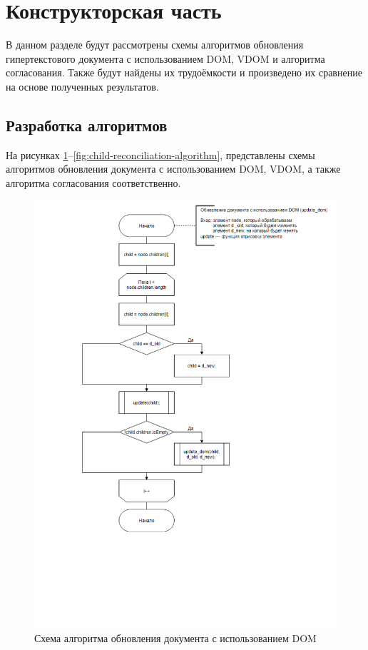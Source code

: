 \section{Конструкторская часть}

В данном разделе будут рассмотрены схемы алгоритмов обновления гипертекстового документа с использованием DOM, VDOM и алгоритма согласования. 
Также будут найдены их трудоёмкости и произведено их сравнение на основе полученных результатов.

\subsection{Разработка алгоритмов}

На рисунках \ref{fig:dom-algorithm}--\ref{fig:child-reconciliation-algorithm}, представлены схемы алгоритмов обновления документа с использованием DOM, VDOM, а также алгоритма согласования соответственно.

\clearpage

\begin{figure}[h]
	\centering
	\includegraphics[width=160mm]{img/dom-algorithm.png}
	\caption{Схема алгоритма обновления документа с использованием DOM}
	\label{fig:dom-algorithm}
\end{figure}

